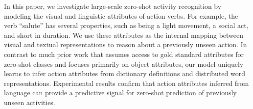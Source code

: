 In this paper, we investigate large-scale zero-shot activity recognition by modeling the visual and linguistic attributes of action verbs. For example, the verb ``salute'' has several properties, such as being a light movement, a social act, and short in duration. We use these attributes as the internal mapping between visual and textual representations to reason about a previously unseen action. In contrast to much prior work that assumes access to gold standard attributes for zero-shot classes and focuses primarily on object attributes, our model uniquely learns to infer action attributes from dictionary definitions and distributed word representations. Experimental results confirm that action attributes inferred from language can provide a predictive signal for zero-shot prediction of previously unseen activities.
